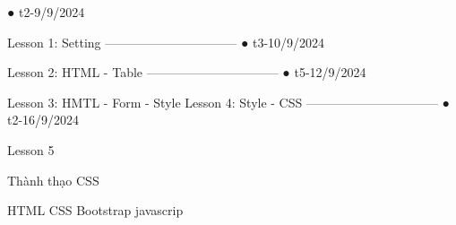 ● t2-9/9/2024

Lesson 1: Setting
--------------------------------   
    ● t3-10/9/2024

Lesson 2: HTML - Table
--------------------------------
    ● t5-12/9/2024

Lesson 3: HMTL - Form - Style
Lesson 4: Style - CSS
--------------------------------
    ● t2-16/9/2024

Lesson 5



Thành thạo CSS

HTML
CSS
Bootstrap 
javascrip

